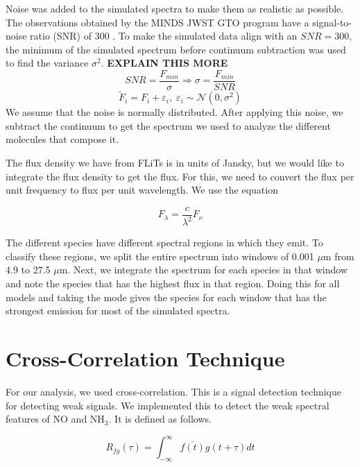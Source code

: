 \documentclass[twoside, single, authoryear, semicolon]{lion-msc}
\newcommand{\4}{$_4$}
\newcommand{\3}{$_3$}
\newcommand{\2}{$_2$}
\begin{document}
Noise was added to the simulated spectra to make them as realistic as possible. The observations obtained by the MINDS JWST GTO program have a signal-to-noise ratio (SNR) of 300 \citep{henning2024mindsjwstmirimidinfrared}.  To make the simulated data align with an $SNR = 300$, the minimum of the simulated spectrum before continuum subtraction was used to find the variance $\sigma^2$. \textbf{EXPLAIN THIS MORE}
\begin{equation}
    SNR = \frac{F_{min}}{\sigma}\Rightarrow\sigma=\frac{F_{min}}{SNR}
\end{equation}
\begin{equation}
    \tilde{F}_i = F_i + \varepsilon_i,\;\varepsilon_i\sim\mathcal{N}(0, \sigma^2)
\end{equation}
We assume that the noise is normally distributed. After applying this noise, we subtract the continuum to get the spectrum we used to analyze the different molecules that compose it.


The flux density we have from FLiTs is in units of Jansky, but we would like to integrate the flux density to get the flux. For this, we need to convert the flux per unit frequency to flux per unit wavelength. We use the equation

\begin{equation}
    F_\lambda=\frac{c}{\lambda^2}F_\nu
\end{equation}

The different species have different spectral regions in which they emit. To classify these regions, we split the entire spectrum into windows of 0.001 $\mu$m from 4.9 to 27.5 $\mu$m. Next, we integrate the spectrum for each species in that window and note the species that has the highest flux in that region. Doing this for all models and taking the mode gives the species for each window that has the strongest emission for most of the simulated spectra.  


\section{Cross-Correlation Technique}
For our analysis, we used cross-correlation. This is a signal detection technique for detecting weak signals. We implemented this to detect the weak spectral features of NO and NH\3. It is defined as follows. 

\begin{equation}
    R_{fg}(\tau)=\int^\infty_{-\infty}\overline{f(t)}g(t+\tau)dt
\end{equation}
\end{document}
